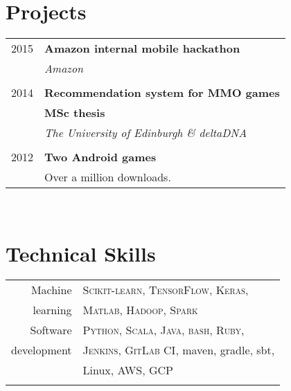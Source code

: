 \documentclass[10pt]{article} %
\begin{document}
{\begin{minipage}[t]{0.44\textwidth}
\begin{tabular}{rl}

\end{tabular}\\[10pt]


\vspace{0.5cm}
\section{Projects}

\begin{tabular}{rl}

2015     & \textbf{Amazon internal mobile hackathon}\\
& \textit{Amazon}\\
&\\
2014     & \textbf{Recommendation system for MMO games}\\
         & \textbf{MSc thesis}\\
& \textit{The University of Edinburgh \& deltaDNA}\\
&\\
2012     & \textbf{Two Android games}\\
         & Over a million downloads.\\

\end{tabular}\\[10pt]


\vspace{0.5cm}
\section{Technical Skills}

\begin{tabular}{rl}
Machine & \textsc{Scikit-learn}, \textsc{TensorFlow}, \textsc{Keras},\\
learning & \textsc{Matlab}, \textsc{Hadoop}, \textsc{Spark}\\
\rule{0pt}{4ex}   
Software & \textsc{Python}, \textsc{Scala}, \textsc{Java}, \textsc{bash}, \textsc{Ruby},\\
development & \textsc{Jenkins}, \textsc{GitLab CI}, maven, gradle, sbt,\\
& Linux, \textsc{AWS}, \textsc{GCP}\\
& \\
\end{tabular}


\end{minipage}}
\end{document}
